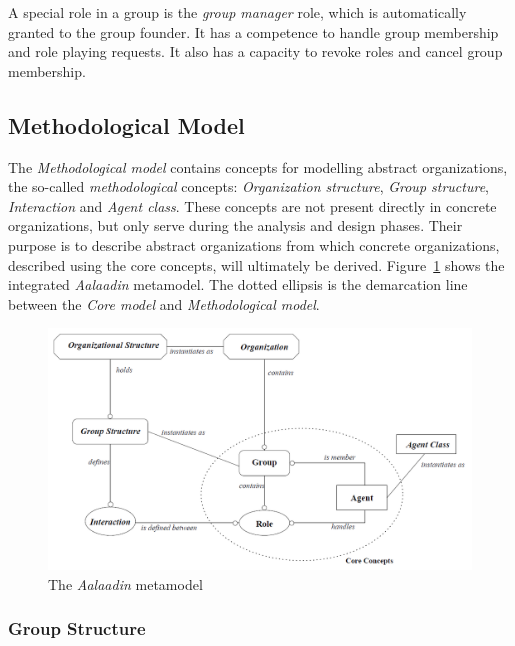 A special role in a group is the \textit{group manager} role, which is automatically granted to the group founder.
It has a competence to handle group membership and role playing requests.
It also has a capacity to revoke roles and cancel group membership.

\subsection{Methodological Model}

The \textit{Methodological model} contains concepts for modelling abstract organizations, the so-called \textit{methodological} concepts: \textit{Organization structure}, \textit{Group structure}, \textit{Interaction} and \textit{Agent class}.
These concepts are not present directly in concrete organizations, but only serve during the analysis and design phases.
Their purpose is to describe abstract organizations from which concrete organizations, described using the core concepts, will ultimately be derived.
Figure~\ref{figure:aalaadin-metamodel} shows the integrated \textit{Aalaadin} metamodel. The dotted ellipsis is the demarcation line between the \textit{Core model} and \textit{Methodological model}.

\begin{figure}[h]
	\centering
	\includegraphics[width=\textwidth]{images/aalaadin/aalaadin-metamodel.png}
	\caption{The \textit{Aalaadin} metamodel \cite{Ferber97}}
	\label{figure:aalaadin-metamodel}
\end{figure}

\subsubsection*{Group Structure}

